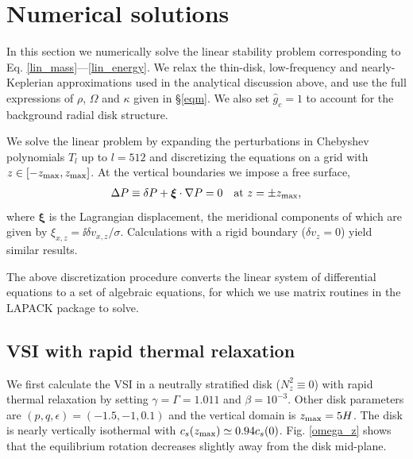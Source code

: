 \section{Numerical solutions}\label{numerical}
In this section we numerically solve the linear stability problem
corresponding to Eq. \ref{lin_mass}---\ref{lin_energy}. 
We relax the thin-disk, low-frequency and nearly-Keplerian
approximations used in the analytical discussion above, and  
use the full expressions of $\rho$, $\Omega$ and
$\kappa$ given in \S\ref{eqm}. We also set $\hat{g}_c=1$ to
account for the background radial disk structure.  


We solve the linear problem by expanding the
perturbations in Chebyshev polynomials $T_l$ up to $l=512$
and discretizing the equations on a grid with
$z\in[-z_\mathrm{max},z_\mathrm{max}]$. At the vertical boundaries we impose a free
surface, 
\begin{align}
  \Delta P \equiv \delta P + \bm{\xi}\cdot\nabla P= 0 \quad \text{at } z=\pm z_\mathrm{max},
\end{align}
where $\bm{\xi}$ is the Lagrangian displacement, the meridional
components of which are given by $\xi_{x,z} = \ii\delta
v_{x,z}/\sigma$. Calculations with a rigid boundary ($\delta v_z=0$)
yield similar results. 

The above discretization procedure
converts the linear system of differential equations to a set of 
algebraic equations, for which we use matrix routines in the LAPACK
package to solve. 


\subsection{VSI with rapid thermal relaxation}\label{vertiso_pertiso} 
We first calculate the VSI in a neutrally
stratified disk ($N_z^2\equiv0$) with rapid thermal relaxation by
setting $\gamma=\Gamma=1.011$ and $\beta=10^{-3}$. Other disk
parameters are $(p,q,\epsilon)=(-1.5,-1,0.1)$ and the vertical domain
is $z_\mathrm{max} = 5H$. The disk is nearly vertically isothermal with
$c_s(z_\mathrm{max})\simeq 0.94 c_s(0)$. Fig. \ref{omega_z} shows that the 
equilibrium rotation decreases slightly away  from the disk mid-plane.  

